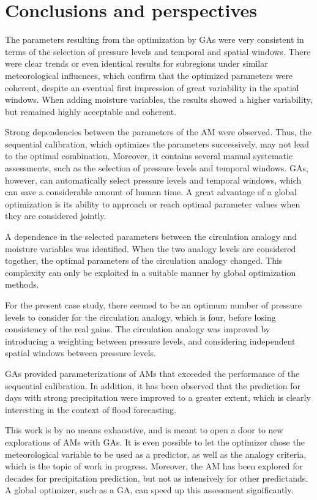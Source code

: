 \documentclass[review]{elsarticle}
\begin{document}
\section{Conclusions and perspectives}
\label{sec:conclusions}


The parameters resulting from the optimization by GAs were very consistent in terms of the selection of pressure levels and temporal and spatial windows. There were clear trends or even identical results for subregions under similar meteorological influences, which confirm that the optimized parameters were coherent, despite an eventual first impression of great variability in the spatial windows. When adding moisture variables, the results showed a higher variability, but remained highly acceptable and coherent.

Strong dependencies between the parameters of the AM were observed. Thus, the sequential calibration, which optimizes the parameters successively, may not lead to the optimal combination. Moreover, it contains several manual systematic assessments, such as the selection of pressure levels and temporal windows. GAs, however, can automatically select pressure levels and temporal windows, which can save a considerable amount of human time. A great advantage of a global optimization is its ability to approach or reach optimal parameter values when they are considered jointly. 

A dependence in the selected parameters between the circulation analogy and moisture variables was identified. When the two analogy levels are considered together, the optimal parameters of the circulation analogy changed. This complexity can only be exploited in a suitable manner by global optimization methods.

For the present case study, there seemed to be an optimum number of pressure levels to consider for the circulation analogy, which is four, before losing consistency of the real gains. The circulation analogy was improved by introducing a weighting between pressure levels, and considering independent spatial windows between pressure levels.

GAs provided parameterizations of AMs that exceeded the performance of the sequential calibration. In addition, it has been observed that the prediction for days with strong precipitation were improved to a greater extent, which is clearly interesting in the context of flood forecasting.

This work is by no means exhaustive, and is meant to open a door to new explorations of AMs with GAs. It is even possible to let the optimizer chose the meteorological variable to be used as a predictor, as well as the analogy criteria, which is the topic of work in progress. Moreover, the AM has been explored for decades for precipitation prediction, but not as intensively for other predictands. A global optimizer, such as a GA, can speed up this assessment significantly.
\end{document}
